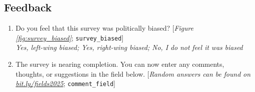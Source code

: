  \subsection*{Feedback} 
 \begin{enumerate}[resume] 
\item  \label{q:survey_biased} Do you feel that this survey was politically biased? [\textit{Figure \ref{fig:survey_biased}}; 
\verb|survey_biased|]
  \\ \textit{Yes, left-wing biased; Yes, right-wing biased; No, I do not feel it was biased}

\item  \label{q:comment_field} The survey is nearing completion. You can now enter any comments, thoughts, or suggestions in the field below. [\textit{Random answers can be found on \href{http://preferences-pol.fr/fields2025.html}{bit.ly/fields2025}}; 
\verb|comment_field|]



 \end{enumerate} 

